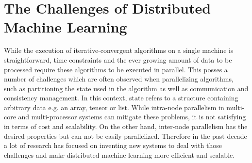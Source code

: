 \section{The Challenges of Distributed Machine Learning}
\label{s:distributed_ml}
While the execution of iterative-convergent algorithms on a single machine is straightforward, time constraints and the ever growing amount of data to be processed require these algorithms to be executed in parallel.
This posses a number of challenges which are often observed when parallelizing algorithms, such as partitioning the state used in the algorithm as well as communication and consistency management.
In this context, state refers to a structure containing arbitrary data e.g. an array, tensor or list.
While intra-node parallelism in multi-core and multi-processor systems can mitigate these problems, it is not satisfying in terms of cost and scalability.
On the other hand, inter-node parallelism has the desired properties but can not be easily parallelized.
Therefore in the past decade a lot of research has focused on inventing new systems to deal with those challenges and make distributed machine learning more efficient and scalable.

